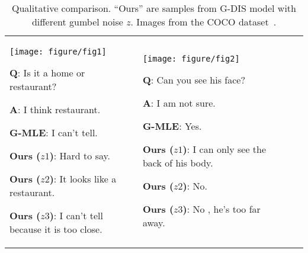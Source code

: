 \documentclass{article}
\begin{document}
\begin{table}[t]
    \vspace{-6pt}
	\renewcommand*{\arraystretch}{0.8}
    \setlength{\tabcolsep}{6px}
    \caption{Qualitative comparison. ``Ours'' are samples from G-DIS model with different gumbel noise $z$. Images from the COCO dataset~\cite{lin2014microsoft}.}
    \label{table:qualititve} 
    \begin{center}\hspace{-5.5pt}
    \begin{tabular}{p{3.0cm} p{3.0cm} p{3.0cm} p{3.0cm} p{2.5cm}}
    \toprule
\vspace{-10pt}
    \center
    \texttt{[image: figure/fig1]}
    \newline\vspace{-10pt}
    \begin{minipage}{2.8cm}
    \begin{compactenum}[\hspace{-6pt}]
    \tiny
    \item \tiny \textbf{Q}: Is it a home or restaurant?
    \item \tiny \textbf{A}: I think restaurant. 
	\item \tiny \textbf{G-MLE}: I can't tell.
	\item \tiny \textbf{Ours ($z1$)}: Hard to say.
	\item \tiny \textbf{Ours ($z2$)}: It looks like a restaurant.
	\item \tiny \textbf{Ours ($z3$)}: I can't tell because it is too close.
    \end{compactenum}
    \end{minipage}
    &
    \vspace{-10pt}
    \center
    \texttt{[image: figure/fig2]}
    \newline\vspace{-10pt}
    \begin{minipage}{2.8cm}
    \begin{compactenum}[\hspace{-6pt}]
    \tiny
    \item \tiny \textbf{Q}: Can you see his face?
    \item \tiny \textbf{A}: I am not sure.
	\item \tiny \textbf{G-MLE}: Yes.
	\item \tiny \textbf{Ours ($z1$)}: I can only see the back of his body.
	\item \tiny \textbf{Ours ($z2$)}: No.
	\item \tiny \textbf{Ours ($z3$)}: No , he's too far away.

\end{compactenum}
\end{minipage}
\end{tabular}
\end{center}
\end{table}
\end{document}

